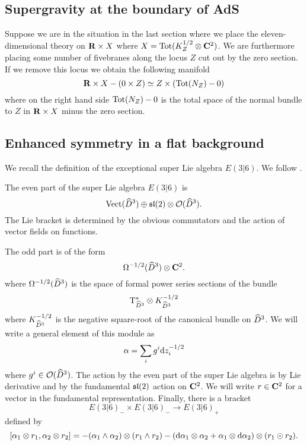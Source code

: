 \subsection{Supergravity at the boundary of AdS}

Suppose we are in the situation in the last section where we place the eleven-dimensional theory on $\R \times X$ where $X = {\rm Tot}(K^{1/2}_Z \otimes \C^2)$. 
We are furthermore placing some number of fivebranes along the locus $Z$ cut out by the zero section. 
If we remove this locus we obtain the following manifold 
\[
\R \times X - \left(0 \times Z\right) \simeq Z \times \left({\rm Tot}(N_Z) - 0\right) 
\]
where on the right hand side ${\rm Tot}(N_Z) - 0$ is the total space of the normal bundle to $Z$ in $\R \times X$ minus the zero section.


\subsection{Enhanced symmetry in a flat background}

\parsec[s:e36]

We recall the definition of the exceptional super Lie algebra $E(3|6)$. 
We follow \cite{Kac_class, KacRudakov}.

The even part of the super Lie algebra $E(3|6)$ is 
\[
\Vect(\Hat{D}^3) \oplus \lie{sl}(2) \otimes \cO(\Hat{D}^3) .
\]
The Lie bracket is determined by the obvious commutators and the action of vector fields on functions. 

The odd part is of the form
\[
\Omega^{-1/2}(\Hat{D}^3) \otimes \C^2 .
\]
where $\Omega^{-1/2}(\Hat{D}^3)$ is the space of formal power series sections of the bundle
\[
\T_{\Hat{D}^3}^{*} \otimes K_{\Hat{D}^3}^{-1/2}
\]
where $K_{\Hat{D}^3}^{-1/2}$ is the negative square-root of the canonical bundle on $\Hat{D}^3$. 
We will write a general element of this module as 
\[
\alpha = \sum_i g^i \d z_i^{-1/2} 
\]
where $g^i \in \cO(\Hat{D}^3)$. 
The action by the even part of the super Lie algebra is by Lie derivative and by the fundamental $\lie{sl}(2)$ action on $\C^2$.
We will write $r \in \C^2$ for a vector in the fundamental representation.
Finally, there is a bracket 
\[
E(3|6)_- \times E(3|6)_- \to E(3|6)_+
\]
defined by
\[
[\alpha_1 \otimes r_1, \alpha_2 \otimes r_2] = - (\alpha_1 \wedge \alpha_2) \otimes (r_1 \wedge r_2) - (\d \alpha_1 \otimes \alpha_2 + \alpha_1 \otimes \d \alpha_2) \otimes (r_1 \odot r_2) .
\]

